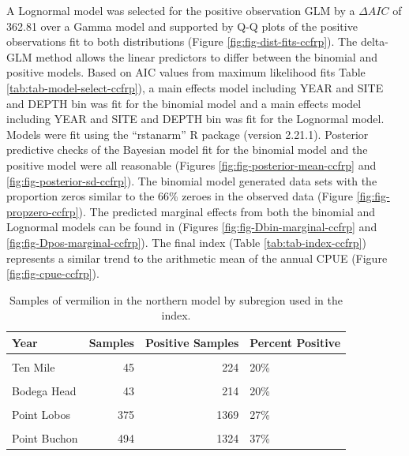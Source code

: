 \documentclass[11pt,
  english,
  a4paper,
]{article}
\begin{document}
A Lognormal model was selected for the positive observation GLM by a {\(\Delta AIC\)\leavevmode\tagmcend\tagstructend} of 362.81 over a Gamma model and supported by Q-Q plots of the positive observations fit to both distributions (Figure \ref{fig:fig-dist-fits-ccfrp}). The delta-GLM method allows the linear predictors to differ between the binomial and positive models. Based on AIC values from maximum likelihood fits Table \ref{tab:tab-model-select-ccfrp}), a main effects model including YEAR and SITE and DEPTH bin was fit for the binomial model and a main effects model including YEAR and SITE and DEPTH bin was fit for the Lognormal model. Models were fit using the ``rstanarm'' R package (version 2.21.1). Posterior predictive checks of the Bayesian model fit for the binomial model and the positive model were all reasonable (Figures \ref{fig:fig-posterior-mean-ccfrp} and \ref{fig:fig-posterior-sd-ccfrp}). The binomial model generated data sets with the proportion zeros similar to the 66\% zeroes in the observed data (Figure \ref{fig:fig-propzero-ccfrp}). The predicted marginal effects from both the binomial and Lognormal models can be found in (Figures \ref{fig:fig-Dbin-marginal-ccfrp} and \ref{fig:fig-Dpos-marginal-ccfrp}). The final index (Table \ref{tab:tab-index-ccfrp}) represents a similar trend to the arithmetic mean of the annual CPUE (Figure \ref{fig:fig-cpue-ccfrp}).

\newpage

\begin{table}

\caption{\label{tab:tab-region-ccfrp}Samples of vermilion in the northern model by subregion used in the index.}
\centering
\begin{tabular}[t]{lrrl}
\toprule
Year & Samples & Positive Samples & Percent Positive\\
\midrule
\cellcolor{gray!6}{South Cape Mendocino} & \cellcolor{gray!6}{84} & \cellcolor{gray!6}{277} & \cellcolor{gray!6}{30\%}\\
Ten Mile & 45 & 224 & 20\%\\
\cellcolor{gray!6}{Stewarts Point} & \cellcolor{gray!6}{111} & \cellcolor{gray!6}{279} & \cellcolor{gray!6}{40\%}\\
Bodega Head & 43 & 214 & 20\%\\
\cellcolor{gray!6}{Ano Nuevo} & \cellcolor{gray!6}{484} & \cellcolor{gray!6}{1879} & \cellcolor{gray!6}{26\%}\\
\addlinespace
Point Lobos & 375 & 1369 & 27\%\\
\cellcolor{gray!6}{Piedras Blancas} & \cellcolor{gray!6}{614} & \cellcolor{gray!6}{966} & \cellcolor{gray!6}{64\%}\\
Point Buchon & 494 & 1324 & 37\%\\
\bottomrule
\end{tabular}
\end{table}
\end{document}
